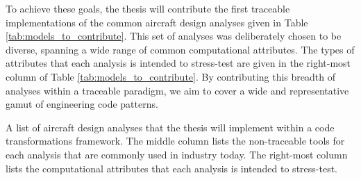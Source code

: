 \documentclass[12pt,vi,oneside]{report}
\begin{document}
    To achieve these goals, the thesis will contribute the first traceable implementations of the common aircraft design analyses given in Table \ref{tab:models_to_contribute}. This set of analyses was deliberately chosen to be diverse, spanning a wide range of common computational attributes. The types of attributes that each analysis is intended to stress-test are given in the right-most column of Table \ref{tab:models_to_contribute}. By contributing this breadth of analyses within a traceable paradigm, we aim to cover a wide and representative gamut of engineering code patterns.

    \begin{table}[H]

        \centering
        \caption{A list of aircraft design analyses that the thesis will implement within a code transformations framework. The middle column lists the non-traceable tools for each analysis that are commonly used in industry today. The right-most column lists the computational attributes that each analysis is intended to stress-test.}
        \label{tab:models_to_contribute}

        \begin{adjustbox}{width=\textwidth}


\end{adjustbox}
\end{table}
\end{document}
